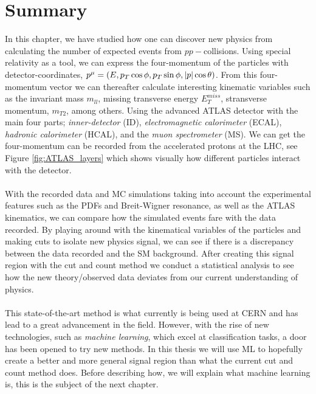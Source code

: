 \documentclass[12pt, a4paper]{book}
\begin{document}
\section{Summary}
In this chapter, we have studied how one can discover new physics from calculating the number of expected events from $pp-$collisions. Using special relativity as a tool, we can express the four-momentum of the particles with 
detector-coordinates, $p^\mu=(E,p_T\cos\phi,p_T\sin\phi,\abs{p}\cos\theta)$. From this four-momentum vector we can thereafter calculate interesting kinematic variables such as the invariant mass $m_{ll}$, missing transverse energy $E_T^{miss}$, 
stransverse momentum, $m_{T2}$, among others. Using the advanced ATLAS detector with the main four parts; \textit{inner-detector} (ID), \textit{electromagnetic calorimeter} (ECAL), \textit{hadronic calorimeter} (HCAL), and the \textit{muon spectrometer} (MS). 
We can get the four-momentum can be recorded from the accelerated protons at the LHC, see Figure \ref{fig:ATLAS_layers} which shows visually how different particles interact with the detector.\\
\\With the recorded data and MC simulations taking into account the experimental features such as the PDFs and Breit-Wigner resonance, as well as the ATLAS kinematics, we can compare how the simulated events fare with the data recorded. 
By playing around with the kinematical variables of the particles and making cuts to isolate new physics signal, we can see if there is a discrepancy between the data recorded and the SM background. After creating this signal region with the cut and count 
method we conduct a statistical analysis to see how the new theory/observed data deviates from our current understanding of physics.\\
\\This state-of-the-art method is what currently is being used at CERN and has lead to a great advancement in the field. However, with the rise of new technologies, such as \textit{machine learning}, which excel at classification tasks, a door has been 
opened to try new methods. In this thesis we will use ML to hopefully create a better and more general signal region than what the current cut and count method does. Before describing how, we will explain what machine learning is, this is the subject 
of the next chapter.
\end{document}
